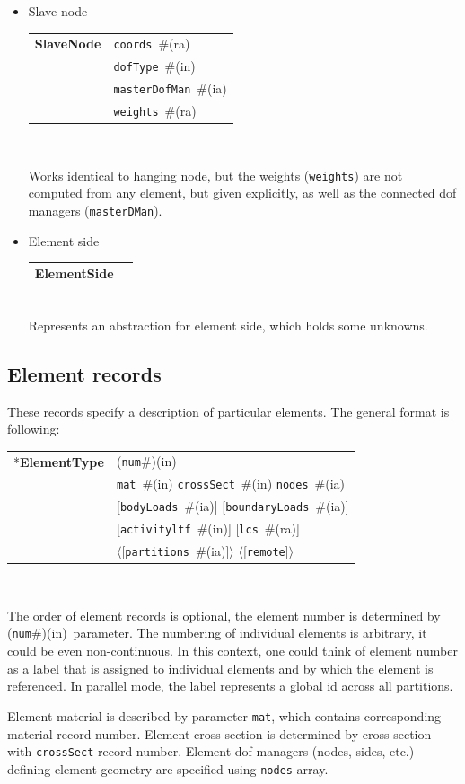 \documentclass[a4paper]{article}
\makeatletter
\newcommand{\param}[1]{\texttt{#1}} %
\newcommand{\optional}[1]{[#1]} %
\newcommand{\field}[2]{\param{#1}~\#{\tiny(#2)}} %
\newcommand{\optField}[2]{\optional{\field{#1}{#2}}}
\newcommand{\optFieldnotype}[1]{[\param{#1}]}
\newcommand{\componentNum}{(\param{num}\#){\tiny(in)}} %
\newcommand{\entKeyword}[1]{*\textbf{#1}} %
\newcommand{\entKeywordInst}[1]{\textbf{#1}} %
\newcommand{\Pmode}[1]{{\sffamily #1}}
\newcommand{\oofemParallel}[1]{$\langle${#1}$\rangle$}
\newcommand{\PoptField}[2]{\oofemParallel{\optField{#1}{#2}}}
\newcommand{\PoptFieldnotype}[1]{\oofemParallel{\optFieldnotype{#1}}}
\newenvironment{record}[1][]{\begin{tabular}{|ll}}{\end{tabular}\\}
\newcommand{\recentry}[2]{{#1}&{#2}\\}
\newcounter{rcc}
\newenvironment{record}[1][\textwidth]{\setcounter{rcc}{0}\begin{tabular*}{#1}{|ll@{\extracolsep{\fill}}r}}{\end{tabular*}\\}
\newcommand{\recentry}[2]{\ifthenelse{\value{rcc}>0}{&$\backslash$ \\}{\setcounter{rcc}{1}}{#1}&{#2}}
\makeatother
\begin{document}
\begin{itemize}
\item Slave node

\begin{record}[0.9\textwidth]
  \recentry{\entKeywordInst{SlaveNode}}{\field{coords}{ra}}
  \recentry{}{\field{dofType}{in}}
  \recentry{}{\field{masterDofMan}{ia}}
  \recentry{}{\field{weights}{ra}}
\end{record}

Works identical to hanging node, but the weights (\param{weights}) are not computed from any element,
but given explicitly, as well as the connected dof managers (\param{masterDMan}).

\item Element side

\begin{record}[0.9\textwidth]
  \recentry{\entKeywordInst{ElementSide}}{}
\end{record}
Represents an abstraction for element side, which holds some unknowns.
\end{itemize}

\subsection{Element records}
\label{_ElementsRecords}
These records specify a description of particular elements. The
general format is following:

\noindent
\begin{record}
  \recentry{\entKeyword{ElementType}}{\componentNum}
  \recentry{}{\field{mat}{in} \field{crossSect}{in} \field{nodes}{ia}}
  \recentry{}{\optField{bodyLoads}{ia} \optField{boundaryLoads}{ia}}
  \recentry{}{\optField{activityltf}{in} \optField{lcs}{ra}}
  \recentry{}{\PoptField{partitions}{ia} \PoptFieldnotype{remote}}
\end{record}

The order of element records is optional, the element number is determined by \componentNum\ parameter.
The numbering of individual elements is arbitrary, it could be even non-continuous. In this context, one could think of element number as a label that is assigned to individual elements and by which the element is referenced.
\Pmode{In parallel mode, the label represents a global id across all partitions.}

Element
material is described by parameter \param{mat}, which contains corresponding
material record number. Element cross
section is determined by cross section  with  \param{crossSect}
record number. Element dof managers (nodes, sides, etc.) defining element geometry are specified using
\param{nodes} array.
\end{document}
